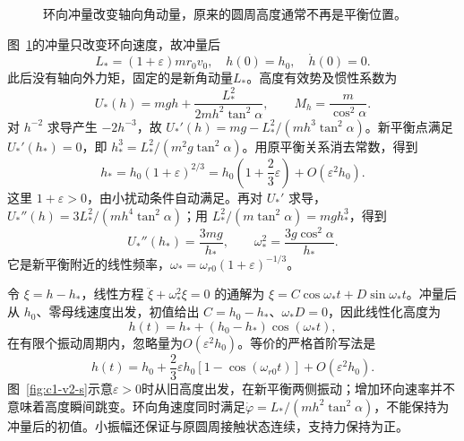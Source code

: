 \begin{figure}[H]\centering
{}
\caption{环向冲量改变轴向角动量，原来的圆周高度通常不再是平衡位置。}\label{fig:c1-v2-q}
\end{figure}
\begin{solution}
图~\ref{fig:c1-v2-q}的冲量只改变环向速度，故冲量后
\[L_*=(1+\varepsilon)mr_0v_0,
\quad h(0)=h_0,\quad\dot h(0)=0.\]
此后没有轴向外力矩，固定的是新角动量$L_*$。高度有效势及惯性系数为
\[U_*(h)=mgh+\frac{L_*^2}{2m h^2\tan^2\alpha},\qquad
M_h=\frac m{\cos^2\alpha}.\]
对 $h^{-2}$ 求导产生 $-2h^{-3}$，故 $U_*'(h)=mg-L_*^2/(m h^3\tan^2\alpha)$。新平衡点满足 $U_*'(h_*)=0$，即 $h_*^3=L_*^2/(m^2g\tan^2\alpha)$。用原平衡关系消去常数，得到
\[\boxed{h_*=h_0(1+\varepsilon)^{2/3}}
=h_0\left(1+\frac23\varepsilon\right)+O(\varepsilon^2h_0).\]
这里 $1+\varepsilon>0$，由小扰动条件自动满足。再对 $U_*'$ 求导，$U_*''(h)=3L_*^2/(m h^4\tan^2\alpha)$；用 $L_*^2/(m\tan^2\alpha)=mgh_*^3$，得到
\[U_*''(h_*)=\frac{3mg}{h_*},\qquad
\boxed{\omega_*^2=\frac{3g\cos^2\alpha}{h_*}}.\]
它是新平衡附近的线性频率，$\omega_*=\omega_{r0}(1+\varepsilon)^{-1/3}$。

令 $\xi=h-h_*$，线性方程 $\ddot\xi+\omega_*^2\xi=0$ 的通解为 $\xi=C\cos\omega_*t+D\sin\omega_*t$。冲量后从 $h_0$、零母线速度出发，初值给出 $C=h_0-h_*$、$\omega_*D=0$，因此线性化高度为
\[h(t)=h_*+(h_0-h_*)\cos(\omega_*t),\]
在有限个振动周期内，忽略量为$O(\varepsilon^2h_0)$。等价的严格首阶写法是
\[\boxed{h(t)=h_0+\frac23\varepsilon h_0
[1-\cos(\omega_{r0}t)]+O(\varepsilon^2h_0)}.\]
图~\ref{fig:c1-v2-s}示意$\varepsilon>0$时从旧高度出发，在新平衡两侧振动；增加环向速率并不意味着高度瞬间跳变。环向角速度同时满足$\dot\varphi=L_*/(mh^2\tan^2\alpha)$，不能保持为冲量后的初值。小振幅还保证与原圆周接触状态连续，支持力保持为正。
\begin{figure}[H]\centering
\begin{tikzpicture}[>=Stealth,line cap=round,line join=round]


\end{tikzpicture}
\end{figure}
\end{solution}
